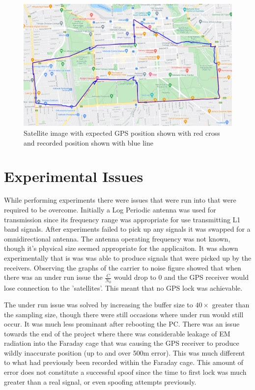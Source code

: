\begin{figure}[H]
    \begin{centering}
        \includegraphics[width=14cm,keepaspectratio]{Figures/2021_3_30_dynamic_CBD_Satellite.PNG}
        \caption{Satellite image with expected GPS position shown with red cross and recorded position shown with blue line}
        \label{fig:CBDdynamicSatelliteImage}
    \end{centering}
\end{figure}

\section{Experimental Issues}
While performing experiments there were issues that were run into that were required to be overcome. Initially a Log Periodic antenna was used for transmission since its
frequency range was appropriate for use transmitting L1 band signals. After experiments failed to pick up any signals it was swapped for a omnidirectional antenna. The
antenna operating frequency was not known, though it's physical size seemed appropriate for the applicaiton. It was shown experimentally that is was
was able to produce signals that were picked up by the receivers. Observing the graphs of the carrier to noise figure showed that when there was an under run
issue the $\frac{C}{N_0}$ would drop to 0 and the GPS receiver would lose connection to the 'satellites'. This meant that no GPS lock was achievable.

The under run issue was solved by increasing the buffer size to $40\times$ greater than the sampling size, though there were still occasions where under run would still
occur. It was much less prominant after rebooting the PC.
There was an issue towards the end of the project where there was considerable leakage of EM radiation into the Faraday cage that was causing the GPS receiver to produce
wildly inaccurate position (up to and over 500m error). This was much different to what had previously been recorded within the Faraday cage. This amount of error does
not constitute a successful spoof since the time to first lock was much greater than a real signal, or even spoofing attempts previously. 

